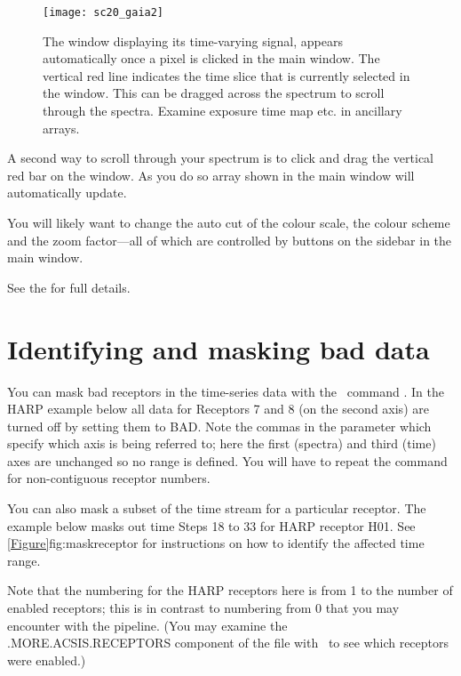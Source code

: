 \documentclass[11pt,oneside,chapters]{starlink}
\begin{document}
\begin{figure}[h!]
\begin{center}
\texttt{[image: sc20\_gaia2]}
\caption[Spectral plot window with \gaia.]{\label{fig:gaia2}
  The  window displaying its time-varying
  signal, appears automatically once a pixel is clicked in the main window.
  The vertical red line indicates the time slice that is currently selected
  in the  window. This can be
  dragged across the spectrum to scroll through the spectra. Examine exposure
  time map etc. in ancillary arrays.}
\end{center}
\end{figure}



A second way to scroll through your spectrum is to click and drag the
vertical red bar on the  window. As you do so
array shown in the main window will automatically update.

You will likely want to change the auto cut of the colour scale, the
colour scheme and the zoom factor---all of which are controlled by
buttons on the sidebar in the main window.

See the  for full
details.

\section{Identifying and masking bad data}
\label{sec:badrecs}

You can mask bad receptors in the time-series data with the \Kappa\
command \chpix. In the HARP example below all data for Receptors 7 and 8
(on the second axis) are turned off by setting them to BAD. Note the
commas in the \param{SECTION} parameter which specify which axis is
being referred to; here the first (spectra) and third (time) axes are
unchanged so no range is defined. You will have to repeat the command
for non-contiguous receptor numbers.

\begin{terminalv}
\end{terminalv}
You can also mask a subset of the time stream for a particular
receptor. The example below masks out time Steps 18 to 33 for HARP receptor
H01. See \cref{Figure}{fig:maskreceptor}{} for instructions on how to
identify the affected time range.
\begin{terminalv}
\end{terminalv}
Note that the numbering for the HARP receptors here is from
1 to the number of enabled receptors; this is in
contrast to numbering from 0 that you may encounter with the pipeline.
(You may examine the .MORE.ACSIS.RECEPTORS component of the
file with \HDSTRACE\ to see which receptors were enabled.)
\end{document}
